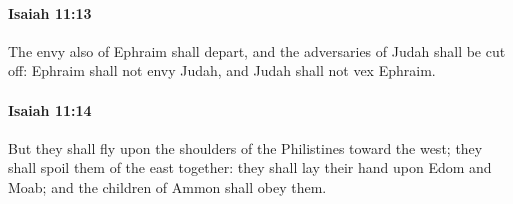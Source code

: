 		\paragraph{Isaiah 11:13} %
			\label{ISAIAH-11-13}

			The envy also of Ephraim shall depart, and the adversaries of Judah shall be cut off: Ephraim shall not envy Judah, and Judah shall not vex Ephraim.


		\paragraph{Isaiah 11:14} %
			\label{ISAIAH-11-14}

			But they shall fly upon the shoulders of the Philistines toward the west; they shall spoil them of the east together: they shall lay their hand upon Edom and Moab; and the children of Ammon shall obey them.


